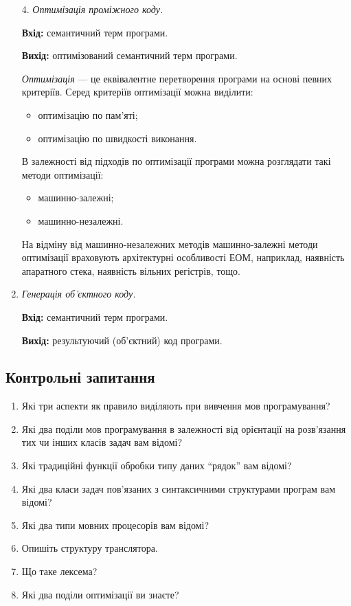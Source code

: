 \begin{enumerate}
4. \textit{Оптимізація проміжного коду.} \medskip

	\textbf{Вхід:} семантичний терм програми. \medskip

	\textbf{Вихід:} оптимізований семантичний терм програми. \medskip

	\textit{Оптимізація} --- це еквівалентне перетворення програми на основі певних
	критеріїв. Серед критеріїв оптимізації можна виділити:
	\begin{itemize}
		\item оптимізацію по пам'яті;
		\item оптимізацію по швидкості виконання. 
	\end{itemize}
	
	В залежності від підходів по оптимізації програми можна розглядати такі
	методи оптимізації:
	\begin{itemize}
		\item машинно-залежні;
		\item машинно-незалежні.
	\end{itemize}

	На відміну від машинно-незалежних
	методів машинно-залежні методи оптимізації враховують архітектурні особливості
	ЕОМ, наприклад, наявність апаратного стека, наявність вільних регістрів, тощо.

	\item \textit{Генерація об'єктного коду.} \medskip

	\textbf{Вхід:} семантичний терм програми. \medskip

	\textbf{Вихід:} результуючий (об'єктний) код програми.
\end{enumerate}

\subsection{Контрольні запитання}

\begin{enumerate}
	\item Які три аспекти як правило виділяють при вивчення мов програмування? 
	\item Які два поділи мов програмування в залежності від орієнтації на розв'язання 
	тих чи інших класів задач вам відомі? 
	\item Які традиційні функції обробки типу даних ``рядок'' вам відомі?
	\item Які два класи задач пов'язаних з синтаксичними структурами програм вам відомі?
	\item Які два типи мовних процесорів вам відомі?
	\item Опишіть структуру транслятора.
	\item Що таке лексема?
	\item Які два поділи оптимізації ви знаєте? 
\end{enumerate}
